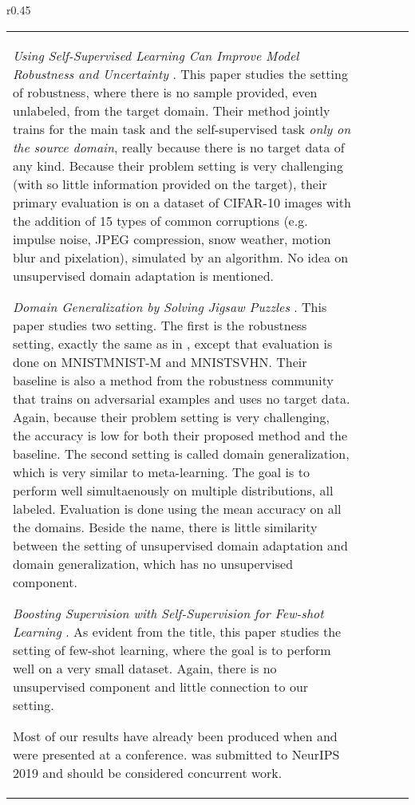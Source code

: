 \documentclass{article} \usepackage{iclr2020_conference,times}
\begin{document}
\begin{wraptable}{r}{0.45\textwidth}
\begin{tabular}{lcccc}
\emph{Using Self-Supervised Learning Can Improve Model Robustness and Uncertainty} \citep{hendrycks2019using}.
This paper studies the setting of robustness, where there is no sample provided, even unlabeled, from the target domain.
Their method jointly trains for the main task and the self-supervised task \emph{only on the source domain}, really because there is no target data of any kind.
Because their problem setting is very challenging (with so little information provided on the target), their primary evaluation is on a dataset of CIFAR-10 images with the addition of 15 types of common corruptions (e.g. impulse noise, JPEG compression, snow weather, motion blur and pixelation), simulated by an algorithm. 
No idea on unsupervised domain adaptation is mentioned.

\emph{Domain Generalization by Solving Jigsaw Puzzles} \citep{carlucci2019domain}.
This paper studies two setting. The first is the robustness setting, exactly the same as in \cite{hendrycks2019using}, except that evaluation is done on MNISTMNIST-M and MNISTSVHN. 
Their baseline is also a method from the robustness community that trains on adversarial examples and uses no target data.
Again, because their problem setting is very challenging, the accuracy is low for both their proposed method and the baseline.
The second setting is called domain generalization, which is very similar to meta-learning. 
The goal is to perform well simultaenously on multiple distributions, all labeled.
Evaluation is done using the mean accuracy on all the domains.
Beside the name, there is little similarity between the setting of unsupervised domain adaptation and domain generalization, which has no unsupervised component.

\emph{Boosting Supervision with Self-Supervision for Few-shot Learning} \citep{su2019boosting}.
As evident from the title, this paper studies the setting of few-shot learning, where the goal is to perform well on a very small dataset. Again, there is no unsupervised component and little connection to our setting.

Most of our results have already been produced when \cite{carlucci2019domain} and \cite{su2019boosting} were presented at a conference. \cite{hendrycks2019using} was submitted to NeurIPS 2019 and should be considered concurrent work.


\end{tabular}
\end{wraptable}
\end{document}
